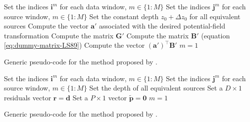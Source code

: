 \begin{algorithm}
	\Input{}
	Set the indices $\mathbf{i}^{m}$ for each data window, $m \in \{ 1 : M \}$ \;
	Set the indices $\mathbf{j}^{m}$ for each source window, $m \in \{ 1 : M \}$ \;
	Set the constant depth $z_{0} + \Delta z_{0}$ for all equivalent sources \;
	Compute the vector $\mathbf{a}'$ associated with the desired potential-field transformation \;
	Compute the matrix $\mathbf{G}'$ \;
	Compute the matrix $\mathbf{B}'$ (equation \ref{eq:dummy-matrix-LS89}) \;
	Compute the vector $\left( \mathbf{a}' \right)^{\top} \mathbf{B}'$ \;
	$m = 1$ \;
	\caption{Generic pseudo-code for the method proposed by \cite{leao-silva1989}.}
	\label{alg:LS89}
\end{algorithm}

\begin{algorithm}
	\Input{}
	Set the indices $\mathbf{i}^{m}$ for each data window, $m \in \{ 1 : M \}$ \;
	Set the indices $\mathbf{j}^{m}$ for each source window, $m \in \{ 1 : M \}$ \;
	Set the depth of all equivalent sources \;
	Set a $D \times 1$ residuals vector $\mathbf{r} = \mathbf{d}$ \;
	Set a $P \times 1$ vector $\tilde{\mathbf{p}} = \mathbf{0}$ \;
	$m = 1$ \;
	\caption{Generic pseudo-code for the method proposed by \cite{soler-uieda2021}.}
	\label{alg:SU21}
\end{algorithm}

